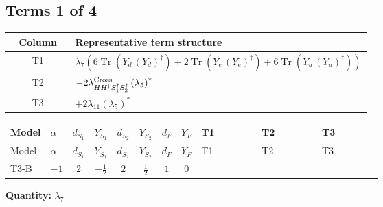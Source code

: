 \documentclass[8pt]{article}
\begin{document}
\begin{landscape}
\subsection*{Terms 1 of 4}
\begin{center}
\begin{tabular}{@{}c >{\raggedright\arraybackslash}p{0.82\linewidth}@{}}
\toprule
Column & Representative term structure \\
\midrule
T1 & \(\displaystyle {\lambda_{7}} (6 \operatorname{Tr}\!\left({Y_d}\,\left({Y_d}\right)^{\dagger}\right)+2 \operatorname{Tr}\!\left({Y_e}\,\left({Y_e}\right)^{\dagger}\right)+6 \operatorname{Tr}\!\left({Y_u}\,\left({Y_u}\right)^{\dagger}\right))\) \\
\midrule
T2 & \(\displaystyle -2 {\lambda_{H H^\dagger S_1^\dagger S_2^\dagger}^{\rm Cross}} \left({\lambda_5}\right)^{*}\) \\
\midrule
T3 & \(\displaystyle +2 {\lambda_{11}} \left({\lambda_5}\right)^{*}\) \\
\midrule
\bottomrule
\end{tabular}
\end{center}
\smallskip
\tiny
\begin{longtable}{@{}llcccccc >{\raggedright\arraybackslash}p{0.21\linewidth} >{\raggedright\arraybackslash}p{0.21\linewidth} >{\raggedright\arraybackslash}p{0.21\linewidth}@{}}
\toprule
Model & $\alpha$ & $d_{S_1}$ & $Y_{S_1}$ & $d_{S_2}$ & $Y_{S_2}$ & $d_F$ & $Y_F$ & T1 & T2 & T3 \\
\midrule
\endfirsthead
\toprule
Model & $\alpha$ & $d_{S_1}$ & $Y_{S_1}$ & $d_{S_2}$ & $Y_{S_2}$ & $d_F$ & $Y_F$ & T1 & T2 & T3 \\
\midrule
\endhead
T3-B & $-1$ & $2$ & $-\frac{1}{2}$ & $2$ & $\frac{1}{2}$ & $1$ & $0$ & \scriptsize\adjustbox{max width=\linewidth}{$\begin{gathered} {\lambda_{7}} (6 \operatorname{Tr}\!\left({Y_d}\,\left({Y_d}\right)^{\dagger}\right)+2 \operatorname{Tr}\!\left({Y_e}\,\left({Y_e}\right)^{\dagger}\right)+6 \operatorname{Tr}\!\left({Y_u}\,\left({Y_u}\right)^{\dagger}\right))\end{gathered}$} & \scriptsize\adjustbox{max width=\linewidth}{$\begin{gathered} -2 {\lambda_{H H^\dagger S_1^\dagger S_2^\dagger}^{\rm Cross}} \left({\lambda_5}\right)^{*}\end{gathered}$} & \scriptsize\adjustbox{max width=\linewidth}{$\begin{gathered} +2 {\lambda_{11}} \left({\lambda_5}\right)^{*}\end{gathered}$} \\
\midrule
\bottomrule
\end{longtable}
\clearpage
\noindent\textbf{Quantity: }$\lambda_{7}$\par\smallskip

\end{landscape}
\end{document}
